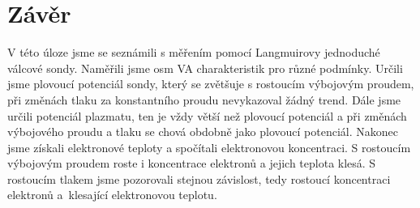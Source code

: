 \documentclass[a4paper,12pt]{article}
\begin{document}
\section{Závěr}
V této úloze jsme se seznámili s měřením pomocí Langmuirovy jednoduché válcové sondy. Naměřili jsme osm VA charakteristik pro různé
podmínky. Určili jsme plovoucí potenciál sondy, který se zvětšuje s rostoucím výbojovým proudem, při změnách tlaku za konstantního
proudu nevykazoval žádný trend. Dále jsme určili potenciál plazmatu, ten je vždy větší než plovoucí potenciál a při změnách výbojového
proudu a tlaku se chová obdobně jako plovoucí potenciál. Nakonec jsme získali elektronové teploty a spočítali elektronovou koncentraci. S rostoucím výbojovým
proudem roste i koncentrace elektronů a jejich teplota klesá. S rostoucím tlakem jsme pozorovali stejnou závislost, tedy rostoucí
koncentraci elektronů a~klesající elektronovou teplotu.
\end{document}
